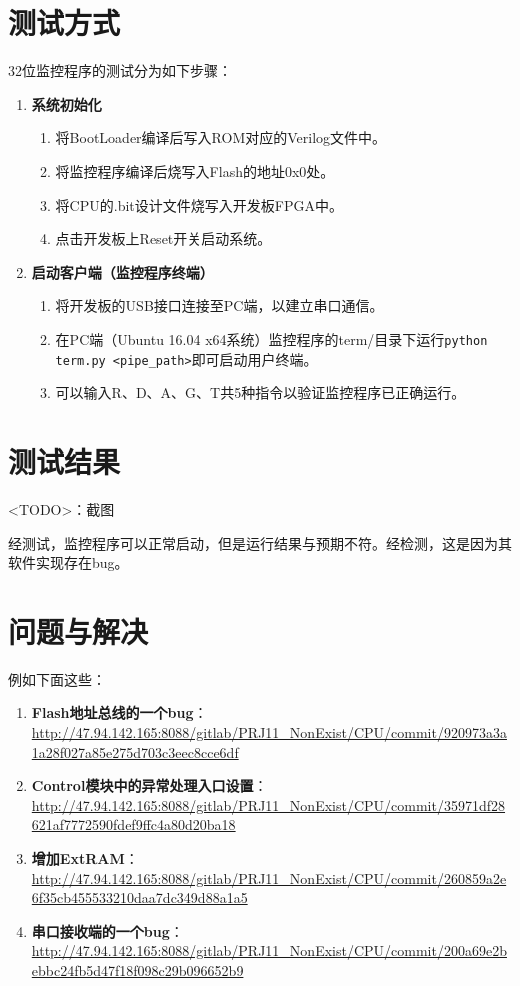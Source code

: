 \section{测试方式}

32位监控程序的测试分为如下步骤：

\begin{enumerate}
    \item {\bf 系统初始化}

    \begin{enumerate}
        \item 将BootLoader编译后写入ROM对应的Verilog文件中。
        \item 将监控程序编译后烧写入Flash的地址0x0处。
        \item 将CPU的.bit设计文件烧写入开发板FPGA中。
        \item 点击开发板上Reset开关启动系统。
    \end{enumerate}

    \item {\bf 启动客户端（监控程序终端）}

    \begin{enumerate}
        \item 将开发板的USB接口连接至PC端，以建立串口通信。
        \item 在PC端（Ubuntu 16.04 x64系统）监控程序的term/目录下运行\texttt{python term.py <pipe\_path>}即可启动用户终端。
        \item 可以输入R、D、A、G、T共5种指令以验证监控程序已正确运行。
    \end{enumerate}

\end{enumerate}

\section{测试结果}

<TODO>：截图

经测试，监控程序可以正常启动，但是运行结果与预期不符。经检测，这是因为其软件实现存在bug。

\section{问题与解决}

例如下面这些：

\begin{enumerate}
    \item {\bf Flash地址总线的一个bug}：\url{http://47.94.142.165:8088/gitlab/PRJ11_NonExist/CPU/commit/920973a3a1a28f027a85e275d703c3eec8cce6df}
    \item {\bf Control模块中的异常处理入口设置}：\url{http://47.94.142.165:8088/gitlab/PRJ11_NonExist/CPU/commit/35971df28621af7772590fdef9ffc4a80d20ba18}
    \item {\bf 增加ExtRAM}：\url{http://47.94.142.165:8088/gitlab/PRJ11_NonExist/CPU/commit/260859a2e6f35cb455533210daa7dc349d88a1a5}
    \item {\bf 串口接收端的一个bug}：\url{http://47.94.142.165:8088/gitlab/PRJ11_NonExist/CPU/commit/200a69e2bebbc24fb5d47f18f098c29b096652b9}
\end{enumerate}
